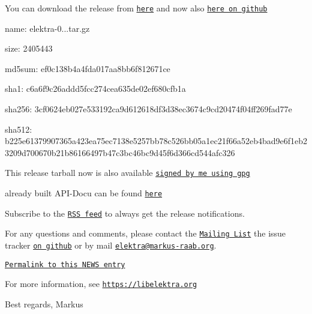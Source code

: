 You can download the release from \href{https://www.libelektra.org/ftp/elektra/releases/elektra-0.8.16.tar.gz}{\tt here} and now also \href{https://github.com/ElektraInitiative/ftp/tree/master/releases/elektra-0.8.16.tar.gz}{\tt here on github}


\begin{DoxyItemize}
\item name\+: elektra-\/0...\+tar.\+gz
\item size\+: 2405443
\item md5sum\+: ef0c138b4a4fda017aa8bb6f812671ce
\item sha1\+: c6a6f9c26addd5fcc274cea635de02ef680cfb1a
\item sha256\+: 3cf0624eb027e533192ca9d612618df3d38ec3674c9cd20474f04ff269fad77e
\item sha512\+: b225e61379907365a423ea75ec7138e5257bb78c526bb05a1ec21f66a52eb4bad9e6f1eb23209d700670b21b86166497b47c3bc46bc9d45f6d366cd544afc326
\end{DoxyItemize}

This release tarball now is also available \href{https://www.libelektra.org/ftp/elektra/releases/elektra-0.8.16.tar.gz.gpg}{\tt signed by me using gpg}

already built A\+P\+I-\/\+Docu can be found \href{https://doc.libelektra.org/api/0.8.16/html/}{\tt here}

Subscribe to the \href{https://doc.libelektra.org/news/feed.rss}{\tt R\+SS feed} to always get the release notifications.

For any questions and comments, please contact the \href{https://lists.sourceforge.net/lists/listinfo/registry-list}{\tt Mailing List} the issue tracker \href{https://git.libelektra.org/issues}{\tt on github} or by mail \href{mailto:elektra@markus-raab.org}{\tt elektra@markus-\/raab.\+org}.

\href{https://doc.libelektra.org/news/9c9247ee-ee9c-4f4a-a68e-76959def9b82.html}{\tt Permalink to this N\+E\+WS entry}

For more information, see \href{https://libelektra.org}{\tt https\+://libelektra.\+org}

Best regards, Markus 